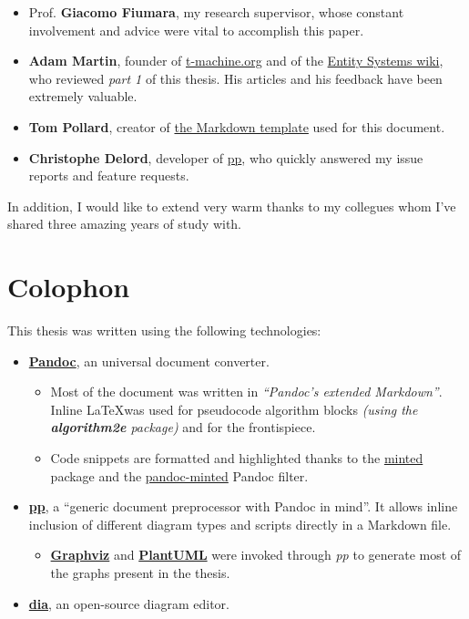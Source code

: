 \documentclass[twoside, 12pt, a4paper, openany]{book}
\providecommand{\tightlist}{%
  \setlength{\itemsep}{0pt}\setlength{\parskip}{0pt}}
\begin{document}
\begin{itemize}
\item
  Prof. \textbf{Giacomo Fiumara}, my research supervisor, whose constant
  involvement and advice were vital to accomplish this paper.
\item
  \textbf{Adam Martin}, founder of
  \href{http://t-machine.org/}{t-machine.org} and of the
  \href{http://entity-systems.wikidot.com/}{Entity Systems wiki}, who
  reviewed \emph{part 1} of this thesis. His articles and his feedback
  have been extremely valuable.
\item
  \textbf{Tom Pollard}, creator of
  \href{https://github.com/tompollard/phd_thesis_markdown}{the Markdown
  template} used for this document.
\item
  \textbf{Christophe Delord}, developer of
  \href{https://github.com/CDSoft/pp}{pp}, who quickly answered my issue
  reports and feature requests.
\end{itemize}

In addition, I would like to extend very warm thanks to my collegues
whom I've shared three amazing years of study with.

\chapter*{Colophon}\label{colophon}

This thesis was written using the following technologies:

\begin{itemize}
\item
  \href{http://pandoc.org/}{\textbf{Pandoc}}, an universal document
  converter.

  \begin{itemize}
  \item
    Most of the document was written in \emph{``Pandoc's extended
    Markdown''}. Inline \LaTeX was used for pseudocode algorithm blocks
    \emph{(using the \textbf{algorithm2e} package)} and for the
    frontispiece.
  \item
    Code snippets are formatted and highlighted thanks to the
    \href{https://github.com/gpoore/minted}{minted} package and the
    \href{https://github.com/nick-ulle/pandoc-minted}{pandoc-minted}
    Pandoc filter.
  \end{itemize}
\item
  \href{https://github.com/CDSoft/pp}{\textbf{pp}}, a ``generic document
  preprocessor with Pandoc in mind''. It allows inline inclusion of
  different diagram types and scripts directly in a Markdown file.

  \begin{itemize}
  \tightlist
  \item
    \href{http://www.graphviz.org}{\textbf{Graphviz}} and
    \href{http://plantuml.com/}{\textbf{PlantUML}} were invoked through
    \emph{pp} to generate most of the graphs present in the thesis.
  \end{itemize}
\item
  \href{http://dia-installer.de/}{\textbf{dia}}, an open-source diagram
  editor.
\end{itemize}
\end{document}
